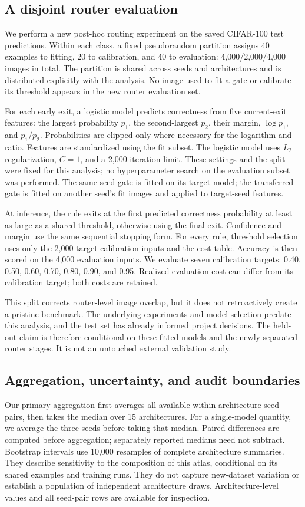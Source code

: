 \documentclass[11pt,a4paper]{article}
\begin{document}
\subsection{A disjoint router evaluation}
We perform a new post-hoc routing experiment on the saved CIFAR-100 test predictions. Within each class, a fixed pseudorandom partition assigns 40 examples to fitting, 20 to calibration, and 40 to evaluation: 4,000/2,000/4,000 images in total. The partition is shared across seeds and architectures and is distributed explicitly with the analysis. No image used to fit a gate or calibrate its threshold appears in the new router evaluation set.

For each early exit, a logistic model predicts correctness from five current-exit features: the largest probability $p_1$, the second-largest $p_2$, their margin, $\log p_1$, and $p_1/p_2$. Probabilities are clipped only where necessary for the logarithm and ratio. Features are standardized using the fit subset. The logistic model uses $L_2$ regularization, $C=1$, and a 2,000-iteration limit. These settings and the split were fixed for this analysis; no hyperparameter search on the evaluation subset was performed. The same-seed gate is fitted on its target model; the transferred gate is fitted on another seed's fit images and applied to target-seed features.

At inference, the rule exits at the first predicted correctness probability at least as large as a shared threshold, otherwise using the final exit. Confidence and margin use the same sequential stopping form. For every rule, threshold selection uses only the 2,000 target calibration inputs and the cost table. Accuracy is then scored on the 4,000 evaluation inputs. We evaluate seven calibration targets: 0.40, 0.50, 0.60, 0.70, 0.80, 0.90, and 0.95. Realized evaluation cost can differ from its calibration target; both costs are retained.

This split corrects router-level image overlap, but it does not retroactively create a pristine benchmark. The underlying experiments and model selection predate this analysis, and the test set has already informed project decisions. The held-out claim is therefore conditional on these fitted models and the newly separated router stages. It is not an untouched external validation study.

\subsection{Aggregation, uncertainty, and audit boundaries}
Our primary aggregation first averages all available within-architecture seed pairs, then takes the median over 15 architectures. For a single-model quantity, we average the three seeds before taking that median. Paired differences are computed before aggregation; separately reported medians need not subtract. Bootstrap intervals use 10,000 resamples of complete architecture summaries. They describe sensitivity to the composition of this atlas, conditional on its shared examples and training runs. They do not capture new-dataset variation or establish a population of independent architecture draws. Architecture-level values and all seed-pair rows are available for inspection.
\end{document}
